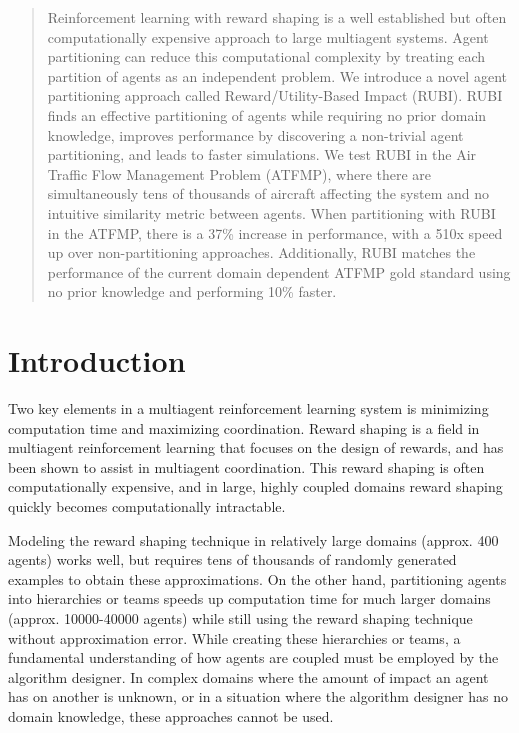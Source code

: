 \documentclass[letterpaper]{article}
\begin{document}
\begin{abstract}
Reinforcement learning with reward shaping is a well established but often computationally expensive approach to large multiagent systems. Agent partitioning can reduce this computational complexity by treating each partition of agents as an independent problem. We introduce a novel agent partitioning approach called Reward/Utility-Based Impact (RUBI). RUBI finds an effective partitioning of agents while requiring no prior domain knowledge, improves performance by discovering a non-trivial agent partitioning, and leads to faster simulations. We test RUBI in the Air Traffic Flow Management Problem (ATFMP), where there are simultaneously tens of thousands of aircraft affecting the system and no intuitive similarity metric between agents. When partitioning with RUBI in the ATFMP, there is a 37\% increase in performance, with a 510x speed up over non-partitioning approaches. Additionally, RUBI matches the performance of the current domain dependent ATFMP gold standard using no prior knowledge and performing 10\% faster.

\end{abstract}








\section{Introduction}
Two key elements in a multiagent reinforcement learning system is minimizing computation time and maximizing coordination. Reward shaping is a field in multiagent reinforcement learning that focuses on the design of rewards, and has been shown to assist in multiagent coordination. This reward shaping is often computationally expensive, and in large, highly coupled domains reward shaping quickly becomes computationally intractable. 

Modeling the reward shaping technique \cite{Proper:2012:MDR:2343896.2344025} in relatively large domains (approx. 400 agents) works well, but requires tens of thousands of randomly generated examples to obtain these approximations. On the other hand, partitioning agents into hierarchies \cite{tumer-holmesparker_ala12} or teams \cite{Curran:2013:AHC:2484920.2485183} speeds up computation time for much larger domains (approx. 10000-40000 agents) while still using the reward shaping technique without approximation error. While creating these hierarchies or teams, a fundamental understanding of how agents are coupled must be employed by the algorithm designer. In complex domains where the amount of impact an agent has on another is unknown, or in a situation where the algorithm designer has no domain knowledge, these approaches cannot be used.
\end{document}
